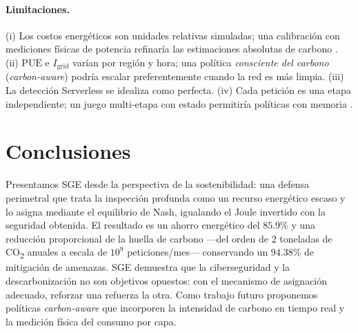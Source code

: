 \documentclass[10pt,twocolumn]{article}
\begin{document}
\paragraph{Limitaciones.} (i) Los costos energ\'eticos son unidades relativas
simuladas; una calibraci\'on con mediciones f\'isicas de potencia refinar\'ia las
estimaciones absolutas de carbono \cite{murugesan}. (ii) $\mathrm{PUE}$ e
$I_{\mathrm{grid}}$ var\'ian por regi\'on y hora; una pol\'itica \emph{consciente del
carbono} (\emph{carbon-aware}) podr\'ia escalar preferentemente cuando la red es m\'as
limpia. (iii) La detecci\'on Serverless se idealiza como perfecta. (iv) Cada petici\'on
es una etapa independiente; un juego multi-etapa con estado permitir\'ia pol\'iticas
con memoria \cite{alpcan}.

\section{Conclusiones}
\label{sec:conclusion}
Presentamos SGE desde la perspectiva de la sostenibilidad: una defensa perimetral que
trata la inspecci\'on profunda como un recurso energ\'etico escaso y lo asigna mediante
el equilibrio de Nash, igualando el Joule invertido con la seguridad obtenida. El
resultado es un ahorro energ\'etico del $85.9\%$ y una reducci\'on proporcional de la
huella de carbono ---del orden de $2$ toneladas de CO\textsubscript{2} anuales a escala
de $10^{9}$ peticiones/mes--- conservando un $94.38\%$ de mitigaci\'on de amenazas.
SGE demuestra que la ciberseguridad y la descarbonizaci\'on no son objetivos opuestos:
con el mecanismo de asignaci\'on adecuado, reforzar una refuerza la otra. Como trabajo
futuro proponemos pol\'iticas \emph{carbon-aware} que incorporen la intensidad de
carbono en tiempo real y la medici\'on f\'isica del consumo por capa.
\end{document}
